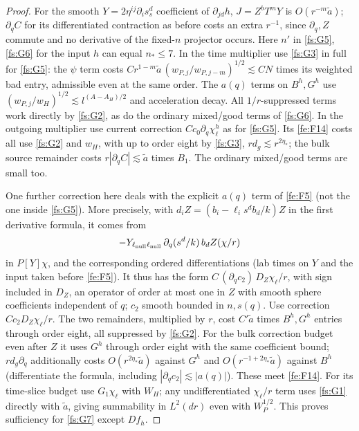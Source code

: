 \begin{proof}
For the smooth \(Y=2\eta^{ij}\partial_i s_s^d\) coefficient of \(\partial_{jd}h\), \(J=Z^bT^m Y\) is \(O(r^{-m}\widetilde a)\); \(\partial_q C\) for its differentiated contraction as before costs an extra \(r^{-1}\), since \(\partial_q,Z\) commute and no derivative of the fixed-\(n\) projector occurs. Here \(n'\) in \eqref{fs:G5}, \eqref{fs:G6} for the input \(h\) can equal \(n_*\le7\). In the time multiplier use \eqref{fs:G3} in full for \eqref{fs:G5}: the \(\psi\) term costs \(C r^{1-m}\widetilde a\, (w_{P,j}/w_{P,j-m})^{1/2}\lesssim C N\) times its weighted bad entry, admissible even at the same order. The \(a(q)\) terms on \(B^h,G^h\) use \((w_{P,j}/w_H)^{1/2}\lesssim l^{(A-A_H)/2}\) and acceleration decay. All \(1/r\)-suppressed terms work directly by \eqref{fs:G2}, as do the ordinary mixed/good terms of \eqref{fs:G6}. In the outgoing multiplier use current correction \(C c_0\partial_q\chi^h_\ell\) as for \eqref{fs:G5}. Its \eqref{fe:F14} costs all use \eqref{fs:G2} and \(w_H\), with up to order eight by \eqref{fs:G3}, \(r d_g\lesssim r^{2\eta_*}\); the bulk source remainder costs \(r|\partial_q C|\lesssim\widetilde a\) times \(B_1\). The ordinary mixed/good terms are small too.

One further correction here deals with the explicit \(a(q)\) term of \eqref{fe:F5} (not the one inside \eqref{fs:G5}). More precisely, with \(d_i Z=(b_i-\ell_i s^d b_d/k)Z\) in the first derivative formula, it comes from
\[
         -Y_{\ell_{\rm null}\ell_{\rm null}}\,
                    \partial_q(s^d/k)\, b_d Z(\chi/r)
\]
in \(P[Y]\chi\), and the corresponding ordered differentiations (lab times on \(Y\) and the input taken before \eqref{fe:F5}). It thus has the form \(C\,(\partial_q c_2)\, D_Z\chi_\ell/r\), with sign included in \(D_Z\), an operator of order at most one in \(Z\) with smooth sphere coefficients independent of \(q\); \(c_2\) smooth bounded in \(n,s(q)\). Use correction \(C c_2 D_Z\chi_\ell/r\). The two remainders, multiplied by \(r\), cost \(C'\widetilde a\) times \(B^h,G^h\) entries through order eight, all suppressed by \eqref{fs:G2}. For the bulk correction budget even after \(Z\) it uses \(G^h\) through order eight with the same coefficient bound; \(r d_g\partial_q\) additionally costs \(O(r^{2\eta_*}\widetilde a)\) against \(G^h\) and \(O(r^{-1+2\eta_*}\widetilde a)\) against \(B^h\) (differentiate the formula, including \(|\partial_q c_2|\lesssim |a(q)|\)). These meet \eqref{fe:F14}. For its time-slice budget use \(G_1\chi_\ell\) with \(W_H\); any undifferentiated \(\chi_\ell/r\) term uses \eqref{fs:G1} directly with \(\widetilde a\), giving summability in \(L^2(dr)\) even with \(W_P^{1/2}\). This proves sufficiency for \eqref{fs:G7} except \(D f_h\).


\end{proof}
